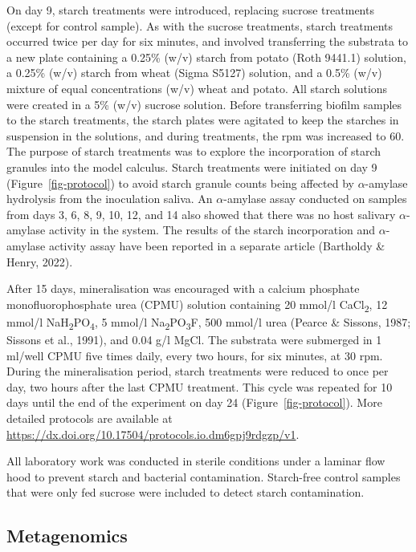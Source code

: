 \documentclass[
]{article}
\begin{document}
On day 9, starch treatments were introduced, replacing sucrose
treatments (except for control sample). As with the sucrose treatments,
starch treatments occurred twice per day for six minutes, and involved
transferring the substrata to a new plate containing a 0.25\% (w/v)
starch from potato (Roth 9441.1) solution, a 0.25\% (w/v) starch from
wheat (Sigma S5127) solution, and a 0.5\% (w/v) mixture of equal
concentrations (w/v) wheat and potato. All starch solutions were created
in a 5\% (w/v) sucrose solution. Before transferring biofilm samples to
the starch treatments, the starch plates were agitated to keep the
starches in suspension in the solutions, and during treatments, the rpm
was increased to 60. The purpose of starch treatments was to explore the
incorporation of starch granules into the model calculus. Starch
treatments were initiated on day 9 (Figure~\ref{fig-protocol}) to avoid
starch granule counts being affected by \(\alpha\)-amylase hydrolysis
from the inoculation saliva. An \(\alpha\)-amylase assay conducted on
samples from days 3, 6, 8, 9, 10, 12, and 14 also showed that there was
no host salivary \(\alpha\)-amylase activity in the system. The results
of the starch incorporation and \(\alpha\)-amylase activity assay have
been reported in a separate article (Bartholdy \& Henry, 2022).

After 15 days, mineralisation was encouraged with a calcium phosphate
monofluorophosphate urea (CPMU) solution containing 20 mmol/l
CaCl\textsubscript{2}, 12 mmol/l
NaH\textsubscript{2}PO\textsubscript{4}, 5 mmol/l
Na\textsubscript{2}PO\textsubscript{3}F, 500 mmol/l urea (Pearce \&
Sissons, 1987; Sissons et al., 1991), and 0.04 g/l MgCl. The substrata
were submerged in 1 ml/well CPMU five times daily, every two hours, for
six minutes, at 30 rpm. During the mineralisation period, starch
treatments were reduced to once per day, two hours after the last CPMU
treatment. This cycle was repeated for 10 days until the end of the
experiment on day 24 (Figure~\ref{fig-protocol}). More detailed
protocols are available at
\url{https://dx.doi.org/10.17504/protocols.io.dm6gpj9rdgzp/v1}.

All laboratory work was conducted in sterile conditions under a laminar
flow hood to prevent starch and bacterial contamination. Starch-free
control samples that were only fed sucrose were included to detect
starch contamination.

\hypertarget{metagenomics}{%
\subsection{Metagenomics}\label{metagenomics}}
\end{document}
